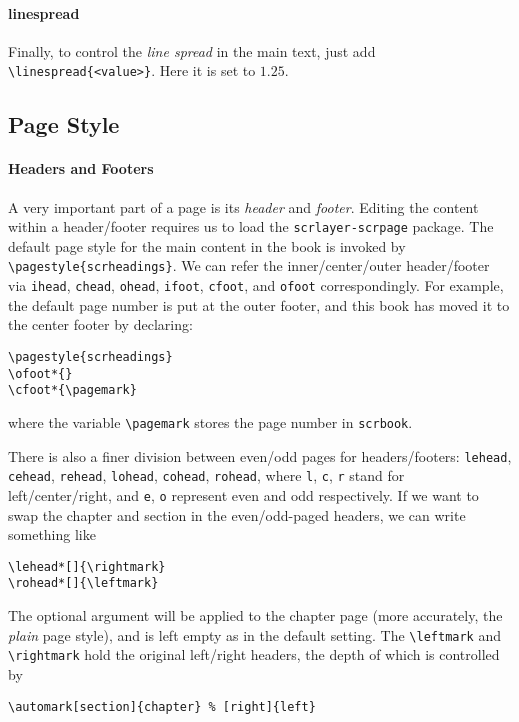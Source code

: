 \paragraph{linespread}
Finally, to control the \textit{line spread} in the main text, just add \texttt{\textbackslash linespread\{<value>\}}. Here it is set to $1.25$.

\subsection{Page Style}

\paragraph{Headers and Footers}
A very important part of a page is its \textit{header} and \textit{footer}. Editing the content within a header/footer requires us to load the \texttt{scrlayer-\allowbreak scrpage} package. The default page style for the main content in the book is invoked by \texttt{\textbackslash pagestyle\{scrheadings\}}. We can refer the inner/center/outer header/footer via \texttt{ihead}, \texttt{chead}, \texttt{ohead}, \texttt{ifoot}, \texttt{cfoot}, and \texttt{ofoot} correspondingly. For example, the default page number is put at the outer footer, and this book has moved it to the center footer by declaring:
\begin{lstlisting}
\pagestyle{scrheadings}
\ofoot*{}
\cfoot*{\pagemark}    
\end{lstlisting}
where the variable \texttt{\textbackslash pagemark} stores the page number in \texttt{scrbook}.

There is also a finer division between even/odd pages for headers/footers: \texttt{lehead}, \texttt{cehead}, \texttt{rehead}, \texttt{lohead}, \texttt{cohead}, \texttt{rohead}, where \texttt{l}, \texttt{c}, \texttt{r} stand for left/center/right, and \texttt{e}, \texttt{o} represent even and odd respectively. If we want to swap the chapter and section in the even/odd-paged headers, we can write something like
\begin{lstlisting}
\lehead*[]{\rightmark}
\rohead*[]{\leftmark}    
\end{lstlisting}
The optional argument will be applied to the chapter page (more accurately, the \textit{plain} page style), and is left empty as in the default setting. The \texttt{\textbackslash leftmark} and \texttt{\textbackslash rightmark} hold the original left/right headers, the depth of which is controlled by
\begin{lstlisting}
\automark[section]{chapter} % [right]{left}
\end{lstlisting}

